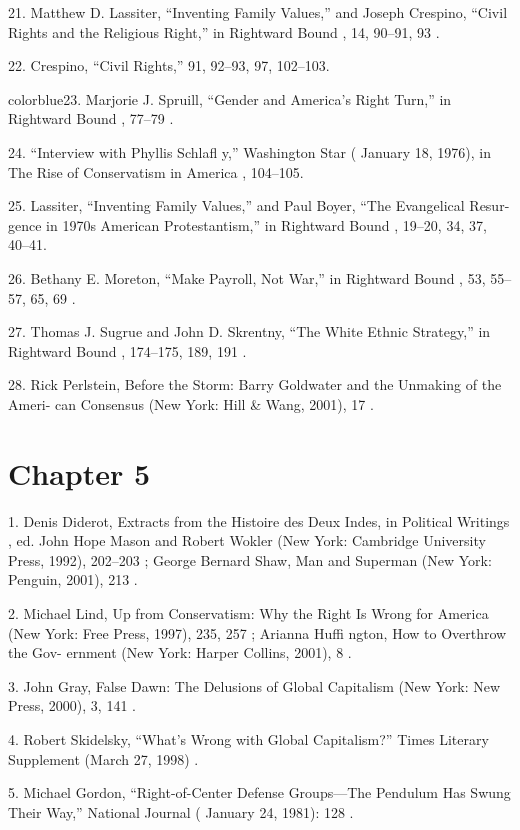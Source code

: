 	{\color{blue}21}. Matthew D. Lassiter, “Inventing Family Values,” and Joseph Crespino, “Civil Rights and the Religious Right,” in Rightward Bound , 14, 90–91, 93 .


	{\color{blue}22}. Crespino, “Civil Rights,” 91, 92–93, 97, 102–103.


	{color{blue}23}. Marjorie J. Spruill, “Gender and America’s Right Turn,” in Rightward Bound , 77–79 .


	{\color{blue}24}. “Interview with Phyllis Schlafl y,” Washington Star ( January 18, 1976), in The Rise of Conservatism in America , 104–105.


	{\color{blue}25}. Lassiter, “Inventing Family Values,” and Paul Boyer, “The Evangelical Resur- gence in 1970s American Protestantism,” in Rightward Bound , 19–20, 34, 37, 40–41.


	{\color{blue}26}. Bethany E. Moreton, “Make Payroll, Not War,” in Rightward Bound , 53, 55–57, 65, 69 .


	{\color{blue}27}. Thomas J. Sugrue and John D. Skrentny, “The White Ethnic Strategy,” in Rightward Bound , 174–175, 189, 191 .


	{\color{blue}28}. Rick Perlstein, Before the Storm: Barry Goldwater and the Unmaking of the Ameri- can Consensus (New York: Hill & Wang, 2001), 17 .


\section{Chapter 5}


	{\color{blue}1}. Denis Diderot, Extracts from the Histoire des Deux Indes, in Political Writings , ed. John Hope Mason and Robert Wokler (New York: Cambridge University Press, 1992), 202–203 ; George Bernard Shaw, Man and Superman (New York: Penguin, 2001), 213 .


	{\color{blue}2}. Michael Lind, Up from Conservatism: Why the Right Is Wrong for America (New York: Free Press, 1997), 235, 257 ; Arianna Huffi ngton, How to Overthrow the Gov- ernment (New York: Harper Collins, 2001), 8 .


	{\color{blue}3}. John Gray, False Dawn: The Delusions of Global Capitalism (New York: New Press, 2000), 3, 141 .


	{\color{blue}4}. Robert Skidelsky, “What’s Wrong with Global Capitalism?” Times Literary Supplement (March 27, 1998) .


	{\color{blue}5}. Michael Gordon, “Right-of-Center Defense Groups—The Pendulum Has Swung Their Way,” National Journal ( January 24, 1981): 128 .


